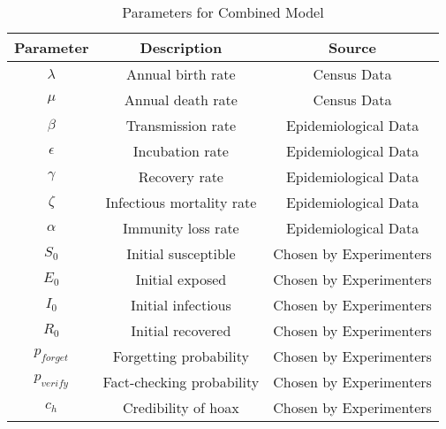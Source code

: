 \documentclass[conference]{IEEEtran}
\begin{document}
%
\begin{table}[!t]
\renewcommand{\arraystretch}{1.3}
\caption{Parameters for Combined Model}
\label{tbl:params}
\centering
\begin{tabular}{|c c c|}
\hline
Parameter & Description & Source\\
\hline
$\lambda$ & Annual birth rate & Census Data\\
\hline
$\mu$ & Annual death rate & Census Data\\
\hline
$\beta$ & Transmission rate & Epidemiological Data\\
\hline
$\epsilon$ & Incubation rate & Epidemiological Data\\
\hline
$\gamma$ & Recovery rate & Epidemiological Data\\
\hline
$\zeta$ & Infectious mortality rate & Epidemiological Data\\
\hline
$\alpha$ & Immunity loss rate & Epidemiological Data\\
\hline
$S_{0}$ & Initial susceptible &  Chosen by Experimenters\\
\hline
$E_{0}$ & Initial exposed &  Chosen by Experimenters\\
\hline
$I_{0}$ & Initial infectious &  Chosen by Experimenters\\
\hline
$R_{0}$ & Initial recovered &  Chosen by Experimenters\\
\hline
$p_{forget}$ & Forgetting probability & Chosen by Experimenters\\
\hline
$p_{verify}$ & Fact-checking probability & Chosen by Experimenters\\
\hline
$c_{h}$ & Credibility of hoax & Chosen by Experimenters\\
\hline
\end{tabular}
\end{table}
\end{document}
